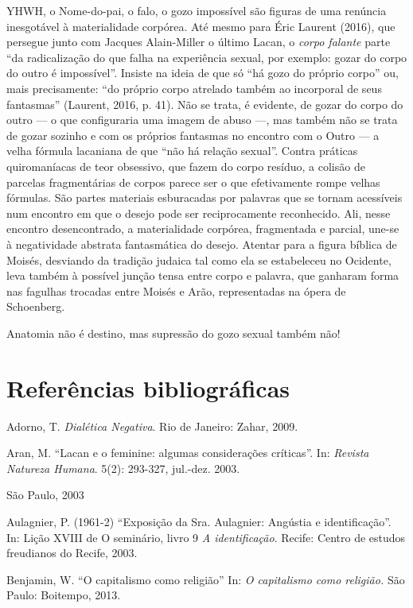 YHWH, o Nome-do-pai, o falo, o gozo impossível são figuras de uma
renúncia inesgotável à materialidade corpórea. Até mesmo para Éric
Laurent (2016), que persegue junto com Jacques Alain-Miller o último
Lacan, o \emph{corpo falante} parte ``da radicalização do que falha na
experiência sexual, por exemplo: gozar do corpo do outro é impossível''.
Insiste na ideia de que só ``há gozo do próprio corpo'' ou, mais
precisamente: ``do próprio corpo atrelado também ao incorporal de seus
fantasmas'' (Laurent, 2016, p. 41). Não se trata, é evidente, de gozar
do corpo do outro --- o que configuraria uma imagem de abuso ---, mas
também não se trata de gozar sozinho e com os próprios fantasmas no
encontro com o Outro --- a velha fórmula lacaniana de que ``não há
relação sexual''. Contra práticas quiromaníacas de teor obsessivo, que
fazem do corpo resíduo, a colisão de parcelas fragmentárias de corpos
parece ser o que efetivamente rompe velhas fórmulas. São partes
materiais esburacadas por palavras que se tornam acessíveis num encontro
em que o desejo pode ser reciprocamente reconhecido. Ali, nesse encontro
desencontrado, a materialidade corpórea, fragmentada e parcial, une-se à
negatividade abstrata fantasmática do desejo. Atentar para a figura
bíblica de Moisés, desviando da tradição judaica tal como ela se
estabeleceu no Ocidente, leva também à possível junção tensa entre corpo
e palavra, que ganharam forma nas fagulhas trocadas entre Moisés e Arão,
representadas na ópera de Schoenberg.

Anatomia não é destino, mas supressão do gozo sexual também não!

\section{Referências bibliográficas}

Adorno, T. \emph{Dialética Negativa}. Rio de Janeiro: Zahar, 2009.

Aran, M. ``Lacan e o feminine: algumas considerações críticas''. In:
\emph{Revista Natureza Humana}. 5(2): 293-327, jul.-dez. 2003.

São Paulo, 2003

Aulagnier, P. (1961-2) ``Exposição da Sra. Aulagnier: Angústia e
identificação''. In: Lição XVIII de O seminário, livro 9 \emph{A
identificação}. Recife: Centro de estudos freudianos do Recife, 2003.

Benjamin, W. ``O capitalismo como religião'' In: \emph{O capitalismo
como religião.} São Paulo: Boitempo, 2013.


